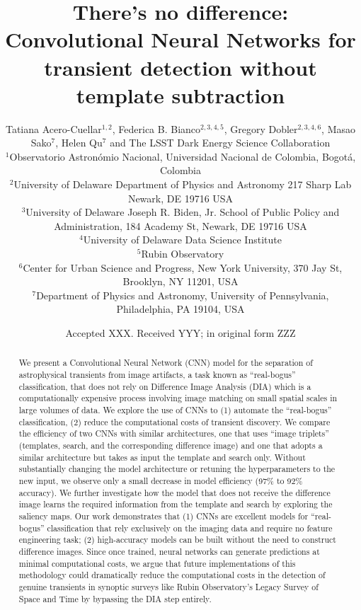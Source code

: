 \documentclass[fleqn,usenatbib]{mnras}
\title[noDIA]{There's no difference: Convolutional Neural Networks for transient detection without template subtraction}
\author[]
{Tatiana Acero-Cuellar$^{1, 2}$,
{Federica B. Bianco}$^{2,3,4,5}$,
Gregory Dobler$^{2,3,4,6}$, 
\newauthor
Masao Sako$^{7}$,
Helen Qu$^{7}$ and 
The LSST Dark Energy Science Collaboration%
\\
$^{1}$Observatorio Astronómio Nacional, Universidad Nacional de Colombia, Bogotá, Colombia \\
$^{2}${University of Delaware
Department of Physics and Astronomy
217 Sharp Lab
Newark, DE 19716 USA}\\
$^{3}${University of Delaware
Joseph R. Biden, Jr. School of Public Policy and Administration, 
184 Academy St, Newark, DE 19716 USA}\\
$^4${University of Delaware
Data Science Institute}\\
$^5${Rubin Observatory}\\
$^6${Center for Urban Science and Progress, New York University, 
370 Jay St, Brooklyn, NY 11201, USA}\\
$^{7}$Department of Physics and Astronomy, University of Pennsylvania, Philadelphia, PA 19104, USA\\
}
\date{Accepted XXX. Received YYY; in original form ZZZ}
\begin{document}
\linenumbers
\label{firstpage}
\pagerange{\pageref{firstpage}--\pageref{lastpage}}
\maketitle


\begin{abstract}

We present a Convolutional Neural Network (CNN) model for the separation of astrophysical transients from image artifacts, a task known as ``real-bogus'' classification, that does not rely on Difference Image Analysis (DIA) which is a computationally expensive process involving image matching on small spatial scales in large volumes of data. We explore the use of CNNs to (1) automate the ``real-bogus'' classification, (2) reduce the computational costs of transient discovery. We compare the efficiency of two CNNs with similar architectures, one that uses ``image triplets'' (templates, search, and the corresponding difference image) and one that adopts a similar architecture but takes as input the template and search only. Without substantially changing the model architecture or retuning the hyperparameters to the new input, we observe only a small decrease in model efficiency (97\% to 92\% accuracy). We further investigate how the model that does not receive the difference image learns the required information from the template and search by exploring the saliency maps. Our work demonstrates that (1) CNNs are excellent models for ``real-bogus'' classification that rely exclusively on the imaging data and require no feature engineering task; (2) high-accuracy models can be built without the need to construct difference images. Since once trained, neural networks can generate predictions at minimal computational costs, we argue that future implementations of this methodology could dramatically reduce the computational costs in the detection of genuine transients in synoptic surveys like Rubin Observatory’s Legacy Survey of Space and Time by bypassing the DIA step entirely.


\end{abstract}
\end{document}
